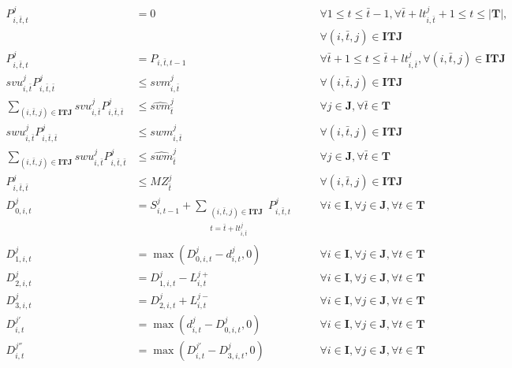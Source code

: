 \documentclass[11pt,letter]{article}
\begin{document}
\begin{align}
P_{i,\bar{t},t}^{j} & = 0 && \quad \forall 1\leq t\leq \bar{t}-1, \forall \bar{t}+lt_{i,\bar{t}}^{j}+1 \leq t \leq |\textbf{T}|, \nonumber\\
& && \quad \forall (i,\bar{t},j)\in \textbf{ITJ} \\
P_{i,\bar{t},t}^{j} & = P_{i,\bar{t},t-1} && \quad \forall \bar{t}+1\leq t\leq \bar{t}+lt_{i,\bar{t}}^{j}, \forall (i,\bar{t},j)\in \textbf{ITJ} \\
svu_{i,\bar{t}}^{j}P_{i,\bar{t},\bar{t}}^{j} & \leq svm_{i,\bar{t}}^{j} && \quad \forall (i,\bar{t},j)\in \textbf{ITJ} \\
\sum_{(i,\bar{t},j)\in \textbf{ITJ} } svu_{i,\bar{t}}^{j}P_{i,\bar{t},\bar{t}}^{j} & \leq \widehat{svm}_{\bar{t}}^{j} && \quad \forall j\in \textbf{J}, \forall \bar{t} \in \textbf{T} \\
swu_{i,\bar{t}}^{j}P_{i,\bar{t},\bar{t}}^{j} & \leq swm_{i,\bar{t}}^{j} && \quad \forall (i,\bar{t},j)\in \textbf{ITJ} \\
\sum_{(i,\bar{t},j)\in \textbf{ITJ} } swu_{i,\bar{t}}^{j}P_{i,\bar{t},\bar{t}}^{j} & \leq \widehat{swm}_{\bar{t}}^{j} && \quad \forall j\in \textbf{J}, \forall \bar{t} \in \textbf{T} \\
P_{i,\bar{t},\bar{t}}^{j} & \leq M Z_{\bar{t}}^{j} && \quad \forall (i,\bar{t},j)\in \textbf{ITJ} \\
D_{0,i,t}^{j} & = S_{i,t-1}^{j}+\sum_{
\begin{matrix} 
(i,\bar{t},j)\in \textbf{ITJ} \\
t=\bar{t}+lt_{i,\bar{t}}^{j}
\end{matrix}
}
P_{i,\bar{t},t}^{j} && \quad \forall i\in \textbf{I},\forall j\in \textbf{J}, \forall t \in \textbf{T} \\
D_{1,i,t}^{j} & = \max(D_{0,i,t}^{j}-d_{i,t}^{j},0) && \quad \forall i\in \textbf{I},\forall j\in \textbf{J}, \forall t \in \textbf{T} \label{eq:max1} \\
D_{2,i,t}^{j} & = D_{1,i,t}^{j}- L_{i,t}^{j{+}} && \quad \forall i\in \textbf{I},\forall j\in \textbf{J}, \forall t \in \textbf{T} \\
D_{3,i,t}^{j} & = D_{2,i,t}^{j}+ L_{i,t}^{j{-}} && \quad \forall i\in \textbf{I},\forall j\in \textbf{J}, \forall t \in \textbf{T} \\
D_{i,t}^{j{'}} & = \max(d_{i,t}^{j}-D_{0,i,t}^{j},0) && \quad \forall i\in \textbf{I},\forall j\in \textbf{J}, \forall t \in \textbf{T} \label{eq:max2}\\
D_{i,t}^{j{''}} & = \max(D_{i,t}^{j{'}}-D_{3,i,t}^{j},0) && \quad \forall i\in \textbf{I},\forall j\in \textbf{J}, \forall t \in \textbf{T} \label{eq:max3}\\

\end{align}
\end{document}
